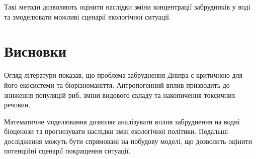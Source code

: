 \documentclass[]{iptconf}
\begin{document}
Такі методи дозволяють оцінити наслідки зміни концентрації забрудників у воді та змоделювати можливі сценарії екологічної ситуації.


\section*{Висновки}


Огляд літератури показав, що проблема забруднення Дніпра є критичною для його екосистеми та біорізноманіття. Антропогенний вплив призводить до зниження популяцій риб, зміни видового складу та накопичення токсичних речовин.

Математичне моделювання дозволяє аналізувати вплив забруднення на водні біоценози та прогнозувати наслідки змін екологічної політики. Подальші дослідження можуть бути спрямовані на побудову моделі, що дозволить оцінити потенційні сценарії покращення ситуації.
\end{document}
